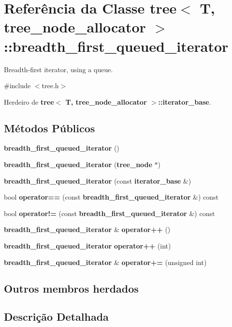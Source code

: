 \section{Referência da Classe tree$<$ T, tree\+\_\+node\+\_\+allocator $>$\+:\+:breadth\+\_\+first\+\_\+queued\+\_\+iterator}
\label{classtree_1_1breadth__first__queued__iterator}


Breadth-\/first iterator, using a queue.  




{\ttfamily \#include $<$tree.\+h$>$}



Herdeiro de {\bf tree$<$ T, tree\+\_\+node\+\_\+allocator $>$\+::iterator\+\_\+base}.

\subsection*{Métodos Públicos}
\begin{DoxyCompactItemize}
\item 
{\bf breadth\+\_\+first\+\_\+queued\+\_\+iterator} ()
\item 
{\bf breadth\+\_\+first\+\_\+queued\+\_\+iterator} ({\bf tree\+\_\+node} $\ast$)
\item 
{\bf breadth\+\_\+first\+\_\+queued\+\_\+iterator} (const {\bf iterator\+\_\+base} \&)
\item 
bool {\bf operator==} (const {\bf breadth\+\_\+first\+\_\+queued\+\_\+iterator} \&) const 
\item 
bool {\bf operator!=} (const {\bf breadth\+\_\+first\+\_\+queued\+\_\+iterator} \&) const 
\item 
{\bf breadth\+\_\+first\+\_\+queued\+\_\+iterator} \& {\bf operator++} ()
\item 
{\bf breadth\+\_\+first\+\_\+queued\+\_\+iterator} {\bf operator++} (int)
\item 
{\bf breadth\+\_\+first\+\_\+queued\+\_\+iterator} \& {\bf operator+=} (unsigned int)
\end{DoxyCompactItemize}
\subsection*{Outros membros herdados}


\subsection{Descrição Detalhada}
